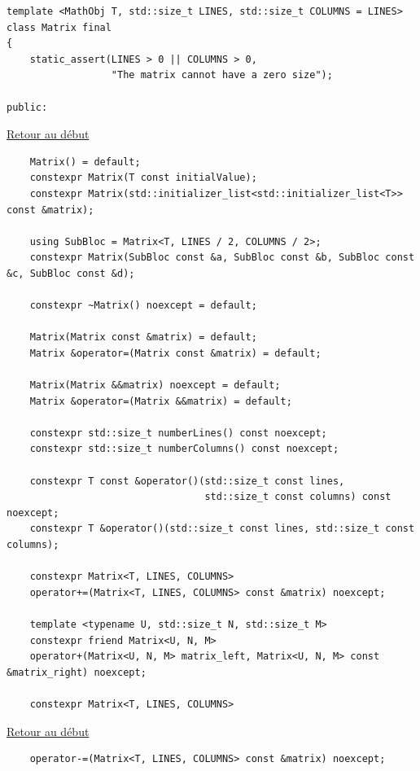 {\begin{frame}[fragile]
\begin{verbatim}
template <MathObj T, std::size_t LINES, std::size_t COLUMNS = LINES>
class Matrix final
{
	static_assert(LINES > 0 || COLUMNS > 0,
				  "The matrix cannot have a zero size");

public:
\end{verbatim}
\end{frame}

\begin{frame}[fragile]
\hyperlink{conclusion}{Retour au début}\newline
\begin{verbatim}
	Matrix() = default;
	constexpr Matrix(T const initialValue);
	constexpr Matrix(std::initializer_list<std::initializer_list<T>> const &matrix);

	using SubBloc = Matrix<T, LINES / 2, COLUMNS / 2>;
	constexpr Matrix(SubBloc const &a, SubBloc const &b, SubBloc const &c, SubBloc const &d);

	constexpr ~Matrix() noexcept = default;

	Matrix(Matrix const &matrix) = default;
	Matrix &operator=(Matrix const &matrix) = default;

	Matrix(Matrix &&matrix) noexcept = default;
	Matrix &operator=(Matrix &&matrix) = default;

	constexpr std::size_t numberLines() const noexcept;
	constexpr std::size_t numberColumns() const noexcept;

	constexpr T const &operator()(std::size_t const lines,
								  std::size_t const columns) const noexcept;
	constexpr T &operator()(std::size_t const lines, std::size_t const columns);

	constexpr Matrix<T, LINES, COLUMNS>
	operator+=(Matrix<T, LINES, COLUMNS> const &matrix) noexcept;

	template <typename U, std::size_t N, std::size_t M>
	constexpr friend Matrix<U, N, M>
	operator+(Matrix<U, N, M> matrix_left, Matrix<U, N, M> const &matrix_right) noexcept;

	constexpr Matrix<T, LINES, COLUMNS>
\end{verbatim}
\end{frame}

\begin{frame}[fragile]
\hyperlink{conclusion}{Retour au début}\newline
\begin{verbatim}
	operator-=(Matrix<T, LINES, COLUMNS> const &matrix) noexcept;


\end{verbatim}
\end{frame}}
